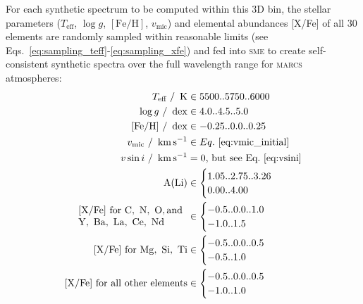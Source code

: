 \documentclass[
  journal=pasa,
  manuscript=research-paper, %
  year=2023,
  volume=37
]{cup-journal}
\newcommand{\SB}[1]{{\textcolor{purple}{#1}}}
\newcommand{\Teff}{$T_\mathrm{eff}$\xspace}
\newcommand{\logg}{$\log g$\xspace}
\newcommand{\feh}{$\mathrm{[Fe/H]}$\xspace}
\newcommand{\vmic}{$v_\mathrm{mic}$\xspace}
\newcommand{\sme}{\textsc{sme}\xspace}
\newcommand{\marcs}{\textsc{marcs}\xspace}
\newcommand{\dex}{\,\mathrm{dex}}	%
\newcommand{\K}{\,\mathrm{K}}	%
\newcommand{\kms}{\,\mathrm{km\,s^{-1}}}	%
\begin{document}
For each synthetic spectrum to be computed within this 3D bin, the stellar parameters (\Teff, \logg, \feh, \vmic) and elemental abundances [X/Fe] of all 30 elements are randomly sampled within reasonable limits (see Eqs.~\ref{eq:sampling_teff}-\ref{eq:sampling_xfe}) and fed into \sme to create self-consistent synthetic spectra over the full wavelength range for \marcs atmospheres:
\begin{align} 
    T_\text{eff}~/~\K &\in {5500..5750..6000} \\ \label{eq:sampling_teff}
    \log g~/~\dex &\in {4.0..4.5..5.0} \\
    \mathrm{[Fe/H]}~/~\dex &\in {-0.25..0.0..0.25} \\
    v_\text{mic}~/~\kms &\in Eq.~\ref{eq:vmic_initial} \\
    v \sin i~/~\kms &= 0\text{, but see Eq.~\ref{eq:vsini}} \\
    \mathrm{A(Li)} &\in \begin{cases} {1.05..2.75..3.26} \\ {0.00..4.00} \end{cases} \\
    \begin{array}{l}
    \mathrm{[X/Fe]~for~C,~N,~O, and}\\
    \mathrm{Y,~Ba,~La,~Ce,~Nd}
    \end{array}
    &\in \begin{cases} {-0.5..0.0..1.0} \\ {-1.0..1.5}  \end{cases} \\
    \mathrm{[X/Fe]~for~Mg,~Si,~Ti} &\in \begin{cases} {-0.5..0.0..0.5} \\ {-0.5..1.0}  \end{cases} \\
    \mathrm{[X/Fe]~for~all~other~elements} &\in \begin{cases} {-0.5..0.0..0.5} \\ {-1.0..1.0} \label{eq:sampling_xfe} \end{cases}
\end{align}

\end{document}
